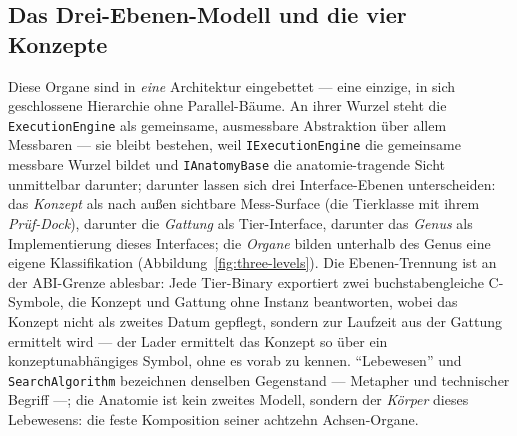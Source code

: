 \begin{nurlang}
\subsection{Das Drei-Ebenen-Modell und die vier Konzepte}\label{sec:anatomy-levels}
Diese Organe sind in \emph{eine} Architektur eingebettet --- eine einzige, in sich geschlossene Hierarchie
ohne Parallel-Bäume. An ihrer Wurzel steht die \texttt{ExecutionEngine} als gemeinsame, ausmessbare
Abstraktion über allem Messbaren --- sie bleibt bestehen, weil \texttt{IExecutionEngine} die
gemeinsame messbare Wurzel bildet und \texttt{IAnatomyBase} die anatomie-tragende Sicht unmittelbar darunter;
darunter lassen sich drei Interface-Ebenen unterscheiden: das \emph{Konzept} als nach außen sichtbare
Mess-Surface (die Tierklasse mit ihrem \emph{Prüf-Dock}), darunter die \emph{Gattung} als Tier-Interface,
darunter das \emph{Genus} als Implementierung dieses Interfaces; die \emph{Organe} bilden unterhalb des
Genus eine eigene Klassifikation (Abbildung~\ref{fig:three-levels})\@. Die
Ebenen-Trennung ist an der ABI-Grenze ablesbar: Jede Tier-Binary exportiert zwei buchstabengleiche
C-Symbole, die Konzept und Gattung ohne Instanz beantworten, wobei das Konzept nicht als zweites Datum
gepflegt, sondern zur Laufzeit aus der Gattung ermittelt wird --- der Lader ermittelt das Konzept so über ein
konzeptunabhängiges Symbol, ohne es vorab zu kennen\@. \enquote{Lebewesen} und \texttt{SearchAlgorithm} bezeichnen denselben
Gegenstand --- Metapher und technischer Begriff ---; die Anatomie ist kein zweites Modell, sondern der
\emph{Körper} dieses Lebewesens: die feste Komposition seiner achtzehn Achsen-Organe.
\begin{figure}[htbp]\centering
{}
\end{figure}
\end{nurlang}
